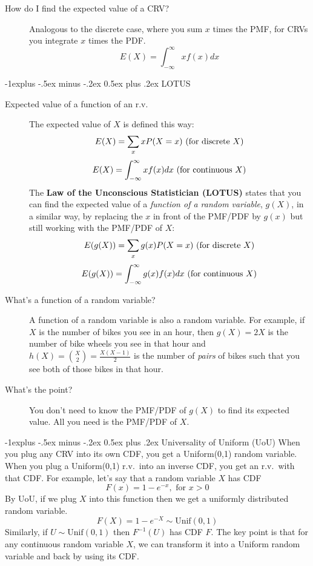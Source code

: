 \documentclass[10pt,landscape]{article}
\makeatletter
\renewcommand{\subsection}{\@startsection{subsection}{2}{0mm}%
                                {-1explus -.5ex minus -.2ex}%
                                {0.5ex plus .2ex}%
                                {\normalfont\normalsize\bfseries}}
\makeatother
\begin{document}
\begin{multicols*}{3}
\begin{description}
\item[How do I find the expected value of a CRV?] Analogous to the discrete case, where you sum $x$ times the PMF, for CRVs you integrate $x$ times the PDF.
\[E(X) = \int^\infty_{-\infty}xf(x)dx \]
\end{description}


\label{lotus}
\subsection{LOTUS}
\begin{description}
\item[Expected value of a function of an r.v.]
The expected value of $X$ is defined this way:
\[E(X) = \sum_x xP(X=x) \textnormal{ (for discrete $X$)}\]
\[E(X) = \int^\infty_{-\infty}xf(x)dx  \textnormal{ (for continuous $X$)}\]
The \textbf{Law of the Unconscious Statistician (LOTUS)} states that you can find the expected value of a \emph{function of a random variable}, $g(X)$, in a similar way, by replacing the $x$ in front of the PMF/PDF by $g(x)$ but still working with the PMF/PDF of $X$:
\[E(g(X)) = \sum_x g(x)P(X=x) \textnormal{ (for discrete $X$)}\]
\[E(g(X)) = \int^\infty_{-\infty}g(x)f(x)dx \textnormal{ (for continuous $X$)}\]
\item[What's a function of a random variable?] A function of a random variable is also a random variable. For example, if $X$ is the number of bikes you see in an hour, then $g(X) =  2X$ is the number of bike wheels you see in that hour and $h(X) = {X \choose 2} = \frac{X(X-1)}{2}$ is the number of \emph{pairs} of bikes such that you see both of those bikes in that hour.
\item[What's the point?] You don't need to know the PMF/PDF of $g(X)$ to find its expected value. All you need is the PMF/PDF of $X$. 
\end{description}

\subsection{Universality of Uniform (UoU)} When you plug any CRV into its own CDF, you get a Uniform(0,1) random variable. When you plug a Uniform(0,1) r.v.~into an inverse CDF, you get an r.v.~with that CDF. For example, let's say that a random variable $X$ has CDF
    \[ F(x) = 1 - e^{-x}, \textrm{ for $x>0$} \]
    By  UoU, if we plug $X$ into this function then we get a uniformly distributed random variable.
    \[ F(X) = 1 - e^{-X} \sim \textrm{Unif}(0,1)\]
    Similarly, if $U \sim \textrm{Unif}(0,1)$ then $F^{-1}(U)$ has CDF $F$. The key point is that {for any continuous random variable $X$, we can transform it into a Uniform random variable and back by using its CDF.}


\end{multicols*}
\end{document}
